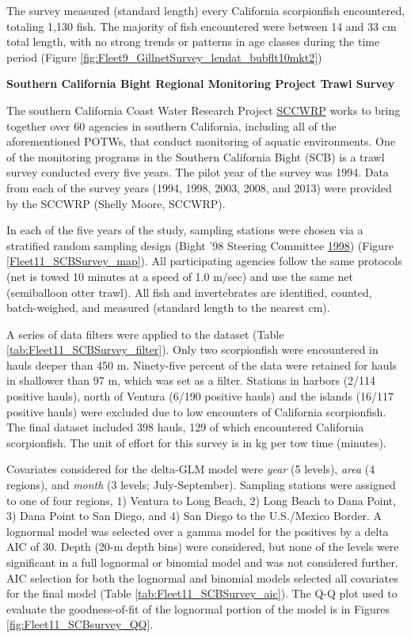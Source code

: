 \documentclass[12pt,]{article}
\begin{document}
The survey measured (standard length) every California scorpionfish
encountered, totaling 1,130 fish. The majority of fish encountered were
between 14 and 33 cm total length, with no strong trends or patterns in
age classes during the time period (Figure
\ref{fig:Fleet9_GillnetSurvey_lendat_bubflt10mkt2})

\textbf{Southern California Bight Regional Monitoring Project Trawl
Survey}

The southern California Coast Water Research Project
\href{http://www.sccwrp.org/Homepage.aspx}{SCCWRP} works to bring
together over 60 agencies in southern California, including all of the
aforementioned POTWs, that conduct monitoring of aquatic environments.
One of the monitoring programs in the Southern California Bight (SCB) is
a trawl survey conducted every five years. The pilot year of the survey
was 1994. Data from each of the survey years (1994, 1998, 2003, 2008,
and 2013) were provided by the SCCWRP (Shelly Moore, SCCWRP).

In each of the five years of the study, sampling stations were chosen
via a stratified random sampling design (Bight '98 Steering Committee
\protect\hyperlink{ref-Bight1998}{1998}) (Figure
\ref{Fleet11_SCBSurvey_map}). All participating agencies follow the same
protocols (net is towed 10 minutes at a speed of 1.0 m/sec) and use the
same net (semiballoon otter trawl). All fish and invertebrates are
identified, counted, batch-weighed, and measured (standard length to the
nearest cm).

A series of data filters were applied to the dataset (Table
\ref{tab:Fleet11_SCBSurvey_filter}). Only two scorpionfish were
encountered in hauls deeper than 450 m. Ninety-five percent of the data
were retained for hauls in shallower than 97 m, which was set as a
filter. Stations in harbors (2/114 positive hauls), north of Ventura
(6/190 positive hauls) and the islands (16/117 positive hauls) were
excluded due to low encounters of California scorpionfish. The final
dataset included 398 hauls, 129 of which encountered California
scorpionfish. The unit of effort for this survey is in kg per tow time
(minutes).

Covariates considered for the delta-GLM model were \emph{year} (5
levels), \emph{area} (4 regions), and \emph{month} (3 levels;
July-September). Sampling stations were assigned to one of four regions,
1) Ventura to Long Beach, 2) Long Beach to Dana Point, 3) Dana Point to
San Diego, and 4) San Diego to the U.S./Mexico Border. A lognormal model
was selected over a gamma model for the positives by a delta AIC of 30.
Depth (20-m depth bins) were considered, but none of the levels were
significant in a full lognormal or binomial model and was not considered
further. AIC selection for both the lognormal and binomial models
selected all covariates for the final model (Table
\ref{tab:Fleet11_SCBSurvey_aic}). The Q-Q plot used to evaluate the
goodness-of-fit of the lognormal portion of the model is in Figures
\ref{fig:Fleet11_SCBsurvey_QQ}.
\end{document}
